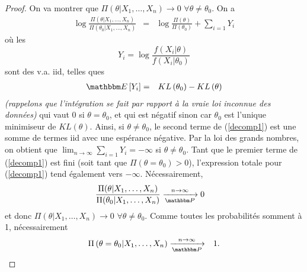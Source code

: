 \begin{proof}%
On va montrer que $\Pi(\theta|X_1,\ldots,X_n)\to 0$ $\forall \theta\neq\theta_0$. On a
\begin{eqnarray}
\log \frac{\Pi(\theta|X_1,\ldots,X_n)}{\Pi(\theta_0|X_1,\ldots,X_n)} & = & \log \frac{\Pi(\theta)}{\Pi(\theta_0)} + \sum\limits_{i=1} Y_i \label{decomp1}
\end{eqnarray}
où les 
$$
Y_i = \log \frac{f(X_i|\theta)}{f(X_i|\theta_0)}
$$
 sont des v.a. iid, telles ques
 \begin{eqnarray*}
 \E\left[Y_i\right] & = & KL\left(\theta_0\right) - KL\left(\theta\right)
 \end{eqnarray*}
 {\it (rappelons que l'intégration se fait par rapport à la vraie loi inconnue des données)}
 qui vaut 0 si $\theta=\theta_0$, et qui est négatif sinon car $\theta_0$ est l'unique minimiseur de $KL(\theta)$. Ainsi, si $\theta\neq\theta_0$, le second terme de (\ref{decomp1}) est une somme de termes iid avec une espérance négative. Par la loi des grands nombres, on obtient que $\lim_{n\to\infty} \sum_{i=1} Y_i = -\infty$ si $\theta\neq\theta_0$. Tant que le premier terme de (\ref{decomp1}) est fini (soit tant que $\Pi(\theta=\theta_0)>0$), l'expression totale pour (\ref{decomp1}) tend également vers $-\infty$. Nécessairement, 
 \begin{eqnarray*}
 \frac{\Pi(\theta|X_1,\ldots,X_n)}{\Pi(\theta_0|X_1,\ldots,X_n)} & \xrightarrow[\Pp]{n\to\infty} 0
 \end{eqnarray*}
 et donc $\Pi(\theta|X_1,\ldots,X_n)\to 0$ $\forall \theta\neq\theta_0$. Comme toutes les probabilités somment à 1, nécessairement \begin{eqnarray*}
\Pi\left(\theta=\theta_0|X_1,\ldots,X_n\right) & \xrightarrow[\Pp]{n\to\infty} & 1.
\end{eqnarray*}
\end{proof}